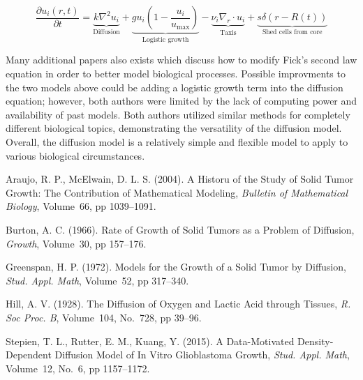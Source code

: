 \documentclass{article}
\begin{document}
\begin{equation}
    \frac{\partial u_i(r, t)}{\partial t} = \underset{\text{Diffusion}}{\underbrace{k \nabla^2 u_i}} + \underset{\text{Logistic growth}}{\underbrace{g u_i \left(1 - \frac{u_i}{u_{\max}}\right)}} - \underset{\text{Taxis}}{\underbrace{\nu_i \nabla_r \cdot u_i}} + \underset{\text{Shed cells from core}}{\underbrace{s \delta(r - R(t))}}
\end{equation}

Many additional papers also exists which discuss how to modify Fick's second law equation in order to better model biological processes. Possible improvments to the two models above could be adding a logistic growth term into the diffusion equation; however, both authors
were limited by the lack of computing power and availability of past models. Both authors utilized similar methods for completely different
biological topics, demonstrating the versatility of the diffusion model. Overall, the diffusion model is a relatively simple and flexible model to apply to
various biological circumstances.

\begin{thebibliography}{99}


    Araujo, R. P., McElwain, D. L. S. (2004).
    \newblock A Historu of the Study of Solid Tumor Growth: The Contribution of Mathematical Modeling,
    \newblock \emph{Bulletin of Mathematical Biology},
    \newblock Volume~66, pp 1039--1091.

    Burton, A. C. (1966).
    \newblock Rate of Growth of Solid Tumors as a Problem of Diffusion,
    \newblock \emph{Growth},
    \newblock Volume~30, pp 157--176.

    Greenspan, H. P. (1972).
    \newblock Models for the Growth of a Solid Tumor by Diffusion,
    \newblock \emph{Stud. Appl. Math},
    \newblock Volume~52, pp 317--340.

    Hill, A. V. (1928).
    \newblock The Diffusion of Oxygen and Lactic Acid through Tissues,
    \newblock \emph{R. Soc Proc. B},
    \newblock Volume~104, No.~728, pp 39--96.

    Stepien, T. L., Rutter, E. M., Kuang, Y. (2015).
    \newblock A Data-Motivated Density-Dependent Diffusion Model of In Vitro Glioblastoma Growth,
    \newblock \emph{Stud. Appl. Math},
    \newblock Volume~12, No.~6, pp 1157--1172.

\end{thebibliography}
\end{document}
